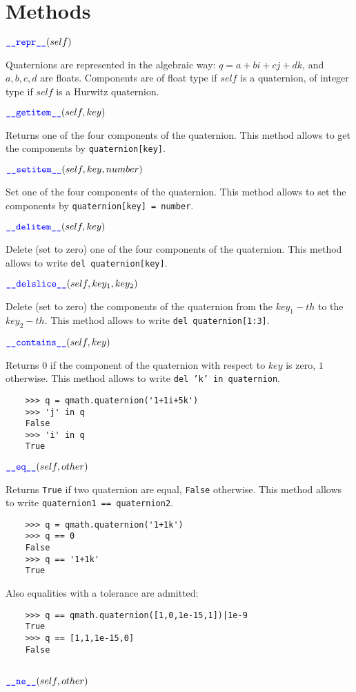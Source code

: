 \documentclass[11pt]{paper}
\begin{document}
    
\bigskip

\section{Methods}
\noindent $\textcolor{blue}{\texttt{\_\_repr\_\_}}(self)$ 

Quaternions are represented in the algebraic way: $q = a+bi+cj+dk$, and $a,b,c,d$ are floats. Components are of float type if $self$ is a quaternion, of integer type if $self$ is a Hurwitz quaternion.

\medskip
 
\noindent $\textcolor{blue}{\texttt{\_\_\mbox{getitem}\_\_}}(self,key)$

Returns one of the four components of the quaternion. This method allows to get the components by \texttt{quaternion[key]}.

\medskip

\noindent $\textcolor{blue}{\texttt{\_\_\mbox{setitem}\_\_}}(self,key, number)$

Set one of the four components of the quaternion. This method allows to set the components by \texttt{quaternion[key] = number}.

\medskip
\noindent $\textcolor{blue}{\texttt{\_\_\mbox{delitem}\_\_}}(self,key)$

Delete (set to zero) one of the four components of the quaternion. This method allows to write \texttt{del quaternion[key]}.

\medskip
\noindent $\textcolor{blue}{\texttt{\_\_\mbox{delslice}\_\_}}(self,key_1,key_2)$

Delete (set to zero) the components of the quaternion from the $key_1-th$ to the $key_2-th$. This method allows to write \texttt{del quaternion[1:3]}.


\medskip

\noindent $\textcolor{blue}{\texttt{\_\_\mbox{contains}\_\_}}(self,key)$

Returns $0$ if the component of the quaternion with respect to $key$ is zero, $1$ otherwise. This method allows to write \texttt{del 'k' in quaternion}.
\begin{verbatim}
    >>> q = qmath.quaternion('1+1i+5k')
    >>> 'j' in q
    False
    >>> 'i' in q
    True
\end{verbatim}

\medskip
\noindent $\textcolor{blue}{\texttt{\_\_\mbox{eq}\_\_}}(self,other)$

Returns \texttt{True} if two quaternion are equal, \texttt{False} otherwise. This method allows to write \texttt{quaternion1 == quaternion2}.
\begin{verbatim}
    >>> q = qmath.quaternion('1+1k')
    >>> q == 0
    False
    >>> q == '1+1k'
    True
\end{verbatim}
\noindent Also equalities with a tolerance are admitted:
\begin{verbatim}
    >>> q == qmath.quaternion([1,0,1e-15,1])|1e-9
    True
    >>> q == [1,1,1e-15,0]
    False
        
\end{verbatim}
\medskip
\noindent $\textcolor{blue}{\texttt{\_\_\mbox{ne}\_\_}}(self,other)$
\end{document}
